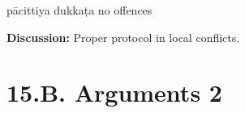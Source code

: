 \begin{exam}{\autoExamName}
\begin{problem}
    \bigskip

    \begin{answers}{3}
      \bChoices
       pācittiya\eAns
       dukkaṭa\eAns
       no offences\eAns
      \eChoices
    \end{answers}

    \bigskip

    \textbf{Discussion:} Proper protocol in local conflicts.

  \end{problem}

\end{exam}

\chapter{15.B. Arguments 2}
\renewcommand*{\theChapterTitle}{15.B. Arguments 2}
